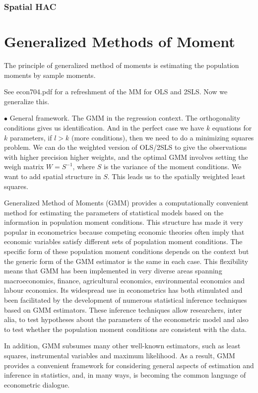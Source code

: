 \documentclass[11pt,a4paper]{amsart}
\theoremstyle{plain}
\theoremstyle{definition}
\begin{document}
\subsubsection{Spatial HAC}\hfill\par 


\section{Generalized Methods of Moment}\hfill\par 
The principle of generalized method of moments is estimating the population moments by sample moments. 

See econ704.pdf for a refreshment of the MM for OLS and 2SLS. Now we generalize this. 

$\bullet$ General framework. The GMM in the regression context. The orthogonality conditions gives us identification. And in the perfect case we have $k$ equations for $k$ parameters, if $l > k$ (more conditions), then we need to do a minimizing squares problem. We can do the weighted version of OLS/2SLS to give the observations with higher precision higher weights, and the optimal GMM involves setting the weigh matrix $W = S^{-1}$, where $S$ is the variance of the moment conditions. We want to add spatial structure in $S$. This leads us to the spatially weighted least squares.

Generalized Method of Moments (GMM) provides a computationally convenient method for estimating the parameters of statistical models based on the information in population moment conditions. This structure has made it very popular in econometrics because competing economic theories often imply that economic variables satisfy different sets of population moment conditions. The specific form of these population moment conditions depends on the context but the generic form of the GMM estimator is the same in each case. This flexibility means that GMM has been implemented in very diverse areas spanning macroeconomics, finance, agricultural economics, environmental economics and labour economics. Its widespread use in econometrics has both stimulated and been facilitated by the development of numerous statistical inference techniques based on GMM estimators. These inference techniques allow researchers, inter alia, to test hypotheses about the parameters of the econometric model and also to test whether the population moment conditions are consistent with the data. 

In addition, GMM subsumes many other well-known estimators, such as least squares, instrumental variables and maximum likelihood. As a result, GMM provides a convenient framework for considering general aspects of estimation and inference in statistics, and, in many ways, is becoming the common language of econometric dialogue.
\end{document}
